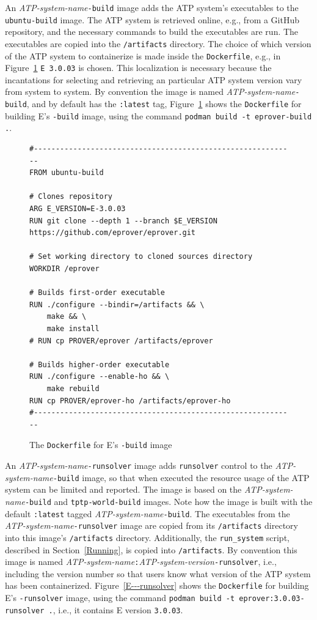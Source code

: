 \documentclass{easychair}
\begin{document}
An {\em ATP-system-name}{\tt-build} image adds the ATP system's executables to the
{\tt ubuntu-build} image.
The ATP system is retrieved online, e.g., from a GitHub repository, and the necessary commands
to build the executables are run.
The executables are copied into the {\tt /artifacts} directory.
The choice of which version of the ATP system to containerize is made inside the {\tt Dockerfile},
e.g., in Figure~\ref{E---build} {\tt E 3.0.03} is chosen.
This localization is necessary because the incantations for selecting and retrieving an
particular ATP system version vary from system to system.
By convention the image is named {\em ATP-system-name}{\tt -build}, and by default has
the {\tt :latest} tag,
Figure~\ref{E---build} shows the {\tt Dockerfile} for building E's {\tt -build} image, using 
the command {\tt podman build -t eprover-build .}.

\begin{figure}[htb]
{\small
\begin{verbatim}
#------------------------------------------------------------
FROM ubuntu-build

# Clones repository
ARG E_VERSION=E-3.0.03
RUN git clone --depth 1 --branch $E_VERSION https://github.com/eprover/eprover.git

# Set working directory to cloned sources directory
WORKDIR /eprover

# Builds first-order executable
RUN ./configure --bindir=/artifacts && \
    make && \
    make install
# RUN cp PROVER/eprover /artifacts/eprover

# Builds higher-order executable
RUN ./configure --enable-ho && \
    make rebuild
RUN cp PROVER/eprover-ho /artifacts/eprover-ho
#------------------------------------------------------------
\end{verbatim}
}
\caption{The {\tt Dockerfile} for E's {\tt -build} image}
\label{E---build}
\end{figure}

An {\em ATP-system-name}{\tt -runsolver} image adds {\tt runsolver} control to the 
{\em ATP-system-name}{\tt-build} image, so that when executed the resource usage of the
ATP system can be limited and reported.
The image is based on the {\em ATP-system-name}{\tt-build} and {\tt tptp-world-build}
images.
Note how the image is built with the default {\tt :latest} tagged 
{\em ATP-system-name}{\tt-build}. 
The executables from the {\em ATP-system-name}{\tt -runsolver} image are copied from its 
{\tt /artifacts} directory into this image's {\tt /artifacts} directory.
Additionally, the {\tt run\_system} script, described in Section~\ref{Running}, is copied into
{\tt /artifacts}.
By convention this image is named
{\em ATP-system-name}{\tt :}{\em ATP-system-version}{\tt -runsolver}, i.e., including the version
number so that users know what version of the ATP system has been containerized.
Figure~\ref{E---runsolver} shows the {\tt Dockerfile} for building E's {\tt -runsolver}
image, using the command {\tt podman~build~-t~eprover:3.0.03-runsolver~.}, i.e., it contains
E version {\tt 3.0.03}.
\end{document}
